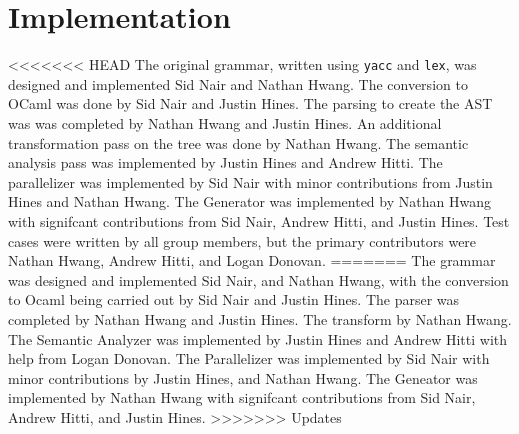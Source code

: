 \section{Implementation}
<<<<<<< HEAD
The original grammar, written using \verb=yacc= and \verb=lex=, was designed and
implemented Sid Nair and Nathan Hwang. The conversion to OCaml was done by Sid
Nair and Justin Hines. The parsing to create the AST was was completed by
Nathan Hwang and Justin Hines. An additional transformation pass on the tree was
done by Nathan Hwang. The semantic analysis pass was implemented by Justin
Hines and Andrew Hitti. The parallelizer was implemented by Sid Nair with minor
contributions from Justin Hines and Nathan Hwang. The Generator was implemented
by Nathan Hwang with signifcant contributions from Sid Nair, Andrew Hitti, and
Justin Hines. Test cases were written by all group members, but the primary
contributors were Nathan Hwang, Andrew Hitti, and Logan Donovan.
=======
The grammar was designed and implemented Sid Nair, and Nathan Hwang, with the
conversion to Ocaml being carried out by Sid Nair and Justin Hines.  The parser was
completed by Nathan Hwang and Justin Hines.  The transform by Nathan Hwang.  The
Semantic Analyzer was implemented by Justin Hines and Andrew Hitti with help from Logan Donovan.  The Parallelizer was
implemented by Sid Nair with minor contributions by Justin Hines, and Nathan Hwang. 
The Geneator was implemented by Nathan Hwang with signifcant contributions from 
Sid Nair, Andrew Hitti, and Justin Hines.
>>>>>>> Updates
